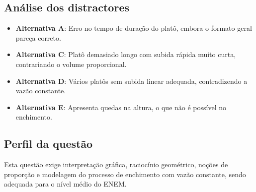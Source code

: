 \documentclass{article}
\begin{document}
\subsection*{Análise dos distractores}
\begin{itemize}
  \item \textbf{Alternativa A}: Erro no tempo de duração do platô, embora o formato geral pareça correto.
  \item \textbf{Alternativa C}: Platô demasiado longo com subida rápida muito curta, contrariando o volume proporcional.
  \item \textbf{Alternativa D}: Vários platôs sem subida linear adequada, contradizendo a vazão constante.
  \item \textbf{Alternativa E}: Apresenta quedas na altura, o que não é possível no enchimento.
\end{itemize}

\subsection*{Perfil da questão}
Esta questão exige interpretação gráfica, raciocínio geométrico, noções de proporção e modelagem do processo de enchimento com vazão constante, sendo adequada para o nível médio do ENEM.
\end{document}
